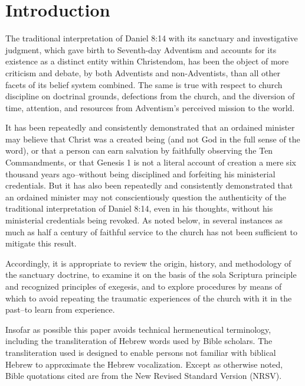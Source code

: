 \part*{Introduction}

The traditional interpretation of Daniel 8:14 with its sanctuary and investigative
judgment, which gave birth to Seventh-day Adventism and accounts for its
existence as a distinct entity within Christendom, has been the object of more
criticism and debate, by both Adventists and non-Adventists, than all other facets
of its belief system combined. The same is true with respect to church discipline
on doctrinal grounds, defections from the church, and the diversion of time,
attention, and resources from Adventism's perceived mission to the world.

It has been repeatedly and consistently demonstrated that an ordained minister
may believe that Christ was a created being (and not God in the full sense of the
word), or that a person can earn salvation by faithfully observing the Ten
Commandments, or that Genesis 1 is not a literal account of creation a mere six
thousand years ago--without being disciplined and forfeiting his ministerial
credentials. But it has also been repeatedly and consistently demonstrated that
an ordained minister may not conscientiously question the authenticity of the
traditional interpretation of Daniel 8:14, even in his thoughts, without his
ministerial credentials being revoked. As noted below, in several instances as
much as half a century of faithful service to the church has not been sufficient to
mitigate this result.

Accordingly, it is appropriate to review the origin, history, and methodology of
the sanctuary doctrine, to examine it on the basis of the sola Scriptura principle
and recognized principles of exegesis, and to explore procedures by means of
which to avoid repeating the traumatic experiences of the church with it in the
past--to learn from experience.

Insofar as possible this paper avoids technical hermeneutical terminology,
including the transliteration of Hebrew words used by Bible scholars. The
transliteration used is designed to enable persons not familiar with biblical
Hebrew to approximate the Hebrew vocalization. Except as otherwise noted, Bible
quotations cited are from the New Revised Standard Version (NRSV).
